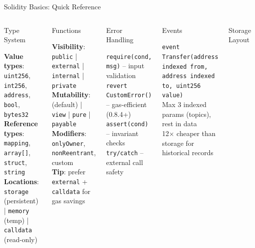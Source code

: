 \documentclass[8pt,aspectratio=169]{beamer}
\begin{document}
\begin{frame}{Solidity Basics: Quick Reference}
\begin{columns}
\begin{block}{Type System}
\colorbox{mlblue!10}{\parbox{0.92\linewidth}{\small
\textbf{Value types}: \texttt{uint256}, \texttt{int256}, \texttt{address}, \texttt{bool}, \texttt{bytes32}\\
\textbf{Reference types}: \texttt{mapping}, \texttt{array[]}, \texttt{struct}, \texttt{string}\\
\textbf{Locations}: \texttt{storage} (persistent) | \texttt{memory} (temp) | \texttt{calldata} (read-only)
}}
\end{block}
\vspace{1mm}
\begin{block}{Functions}
\colorbox{mlgreen!10}{\parbox{0.92\linewidth}{\small
\textbf{Visibility}: \texttt{public} | \texttt{external} | \texttt{internal} | \texttt{private}\\
\textbf{Mutability}: (default) | \texttt{view} | \texttt{pure} | \texttt{payable}\\
\textbf{Modifiers}: \texttt{onlyOwner}, \texttt{nonReentrant}, custom\\
\textbf{Tip}: prefer \texttt{external} + \texttt{calldata} for gas savings
}}
\end{block}
\vspace{1mm}
\begin{block}{Error Handling}
\colorbox{mlred!10}{\parbox{0.92\linewidth}{\small
\texttt{require(cond, msg)} -- input validation\\
\texttt{revert CustomError()} -- gas-efficient (0.8.4+)\\
\texttt{assert(cond)} -- invariant checks\\
\texttt{try/catch} -- external call safety
}}
\end{block}
\begin{block}{Events}
\colorbox{mlorange!10}{\parbox{0.92\linewidth}{\small
\texttt{event Transfer(address indexed from, address indexed to, uint256 value)}\\
Max 3 indexed params (topics), rest in data\\
12$\times$ cheaper than storage for historical records
}}
\end{block}
\vspace{1mm}
\begin{block}{Storage Layout}
\colorbox{mlpurple!10}{\parbox{0.92\linewidth}{\small
}}
\end{block}
\end{columns}
\end{frame}
\end{document}
